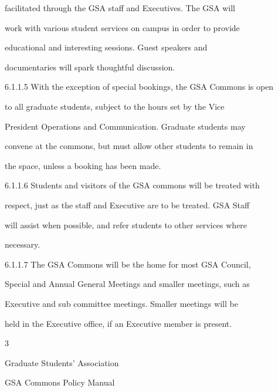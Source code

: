            facilitated  through  the  GSA  staff  and  Executives.  The  GSA  will  

           work  with various student  services on campus  in order to  provide  

           educational       and     interesting      sessions.      Guest      speakers      and  

           documentaries will spark thoughtful discussion.   



6.1.1.5   With the exception of special bookings, the GSA Commons is open  

           to  all  graduate  students,  subject  to  the  hours  set  by  the  Vice  

           President  Operations  and  Communication.  Graduate  students  may  

           convene at the commons, but must allow other students to remain in  

           the space, unless a booking has been made.   



6.1.1.6   Students  and  visitors  of  the  GSA  commons  will  be  treated  with  

           respect, just as the staff and  Executive  are to be treated. GSA Staff  

           will assist when possible, and refer students to other services where  

           necessary.   



6.1.1.7   The  GSA  Commons  will  be  the  home  for  most  GSA  Council,  

           Special and Annual General Meetings and smaller meetings, such as  

           Executive  and  sub  committee  meetings.  Smaller  meetings  will  be  

           held in the Executive office, if an Executive member is present.   



  



                                                  3  

                                  

                                Graduate Students’ Association  

                                GSA Commons Policy Manual  

